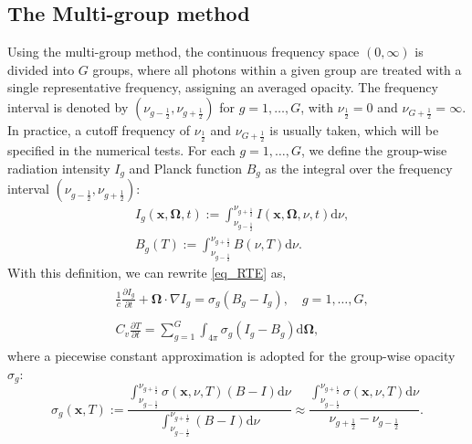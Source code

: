 \documentclass[preprint,12pt]{elsarticle}
\theoremstyle{definition}
\theoremstyle{plain}
\numberwithin{equation}{section}
\numberwithin{algorithm}{section}
\newcounter{eq_count}
\newcounter{subeq_count}
\newcommand{\half}{\frac{1}{2}}
\newcommand{\vOmega}{\mathbf{\Omega}}
\newcommand{\vx}{\mathbf{x}}
\newcommand{\dd}{{\text{d}}}
\newcommand{\pdrv}[2]{\frac{\partial{#1}}{\partial{#2}}}
\begin{document}
\subsection{The Multi-group method}
Using the multi-group method, the continuous frequency space  $(0,\infty)$ is divided into $G$ groups, where all photons within a given group are treated with a single representative frequency, assigning an averaged opacity. The frequency interval is denoted by $(\nu_{g-\frac{1}{2}}, \nu_{g+\frac{1}{2}})$ for $g = 1,\dots,G$, with $\nu_{\frac{1}{2}}=0$ and $\nu_{G+\frac{1}{2}}=\infty$. In practice, a cutoff frequency of $\nu_{\frac{1}{2}}$ and $\nu_{G+\frac{1} {2}}$ is usually taken, which will be specified in the numerical tests. For each $g=1,\ldots,G$, we define the group-wise radiation intensity $I_g$ and Planck function $B_g$ as the integral over the frequency interval $(\nu_{g-\frac{1}{2}}, \nu_{g+\frac{1}{2}})$:
 \begin{subequations}
     \begin{align}
         &I_g(\vx, \vOmega, t) := \int_{\nu_{g-\half}}^{\nu_{g+\half}}I(\vx, \vOmega, \nu, t)\dd{\nu}, \\
         \label{eq_def_B_g}
         &B_g(T) := \int_{\nu_{g-\half}}^{\nu_{g+\half}} B(\nu,T) \dd{\nu}.
     \end{align}
 \end{subequations}
 With this definition, we can rewrite \eqref{eq_RTE}  as,
     \begin{subequations}\label{eq_microscopicSystem}
		\begin{align}
            &\begin{aligned}\label{eq_microscopicSystem_A}
                \frac{1}{c} \frac{\partial I_g}{\partial t}+\vOmega \cdot \nabla I_g = \sigma_{g}(B_g-I_g),  \quad g=1,\ldots,G, 
            \end{aligned}
            \\
		  &\begin{aligned}\label{eq_microscopicSystem_B}
                C_v \pdrv{T}{t}=\sum_{g=1}^{G} \int_{4 \pi} \sigma_g(I_g-B_g) \dd{\vOmega},%
            \end{aligned}
		\end{align}
   \end{subequations} 
where a piecewise constant approximation is adopted for the group-wise opacity $\sigma_g$:
 \begin{equation}\label{eq_Approximation_sigma}
     \sigma_{g}(\vx,T) :=\frac{\int_{\nu_{g-\half}}^{\nu_{g+\half}} \sigma(\vx,\nu,T) (B-I)  \dd{\nu}}{\int_{\nu_{g-\half}}^{\nu_{g+\half}} (B-I) \dd{\nu}}\approx \frac{\int_{\nu_{g-\half}}^{\nu_{g+\half}} \sigma(\vx,\nu,T)  \dd{\nu}}{\nu_{g+\half}-\nu_{g-\half}}.
 \end{equation}
\end{document}
